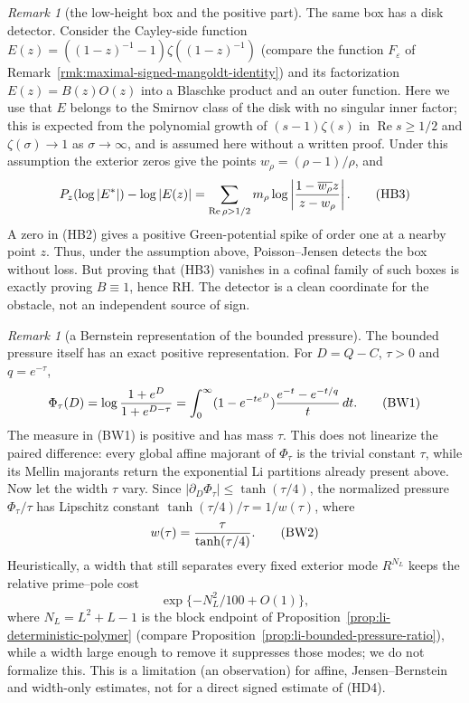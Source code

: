 \documentclass[11pt]{amsart}
\theoremstyle{definition}
\theoremstyle{remark}
\newtheorem{remark}[theorem]{Remark}
\theoremstyle{definition}
\renewcommand{\Re}{\operatorname{Re}}
\begin{document}
\begin{remark}[the low-height box and the positive part]
The same box has a disk detector.  Consider the Cayley-side function
$E(z)=((1-z)^{-1}-1)\zeta((1-z)^{-1})$ (compare the function $F_\varepsilon$
of Remark~\ref{rmk:maximal-signed-mangoldt-identity}) and its factorization
$E(z)=B(z)O(z)$ into a Blaschke product and an outer function.  Here we use
that $E$ belongs to the Smirnov class of the disk with no singular inner
factor; this is expected from the polynomial growth of $(s-1)\zeta(s)$ in
$\Re s\ge1/2$ and $\zeta(\sigma)\to1$ as $\sigma\to\infty$, and is assumed
here without a written proof.  Under this assumption the exterior zeros give
the points $w_\rho=(\rho-1)/\rho$, and
\[
 P_z(\log|E^*|)-\log|E(z)|
 =\sum_{\Re\rho>1/2}m_\rho
 \log\left|{1-\overline{w_\rho}z\over z-w_\rho}\right|.  \tag{HB3}
\]
A zero in (HB2) gives a positive Green-potential spike of order one at a
nearby point \(z\).  Thus, under the assumption above, Poisson--Jensen
detects the box without loss.
But proving that (HB3) vanishes in a cofinal family of such boxes is
exactly proving \(B\equiv1\), hence RH.  The detector is a clean coordinate
for the obstacle, not an independent source of sign.
\end{remark}

\begin{remark}[a Bernstein representation of the bounded pressure]
\label{rmk:bernstein-pressure-width}
The bounded pressure itself has an exact positive representation.  For
$D=Q-C$, $\tau>0$ and $q=e^{-\tau}$,
\[
 \Phi_\tau(D)=\log{1+e^D\over1+e^{D-\tau}}
 =\int_0^\infty(1-e^{-te^D}){e^{-t}-e^{-t/q}\over t}\,dt. \tag{BW1}
\]
The measure in (BW1) is positive and has mass $\tau$.  This does not
linearize the paired difference: every global affine majorant of
$\Phi_\tau$ is the trivial constant $\tau$, while its Mellin majorants
return the exponential Li partitions already present above.  Now let the
width $\tau$ vary.  Since $|\partial_D\Phi_\tau|\le\tanh(\tau/4)$, the
normalized pressure $\Phi_\tau/\tau$ has Lipschitz constant
$\tanh(\tau/4)/\tau=1/w(\tau)$, where
\[
 w(\tau)={\tau\over\tanh(\tau/4)}.                        \tag{BW2}
\]
Heuristically, a width that still separates every fixed exterior mode
$R^{N_L}$ keeps the relative prime--pole cost
\[
 \exp\{-N_L^2/100+O(1)\},                              \tag{BW3}
\]
where $N_L=L^2+L-1$ is the block endpoint of
Proposition~\ref{prop:li-deterministic-polymer} (compare
Proposition~\ref{prop:li-bounded-pressure-ratio}),
while a width large enough to remove it suppresses those modes; we do not
formalize this.  This is a limitation (an observation) for affine,
Jensen--Bernstein and width-only estimates, not for a direct signed
estimate of (HD4).
\end{remark}
\end{document}

